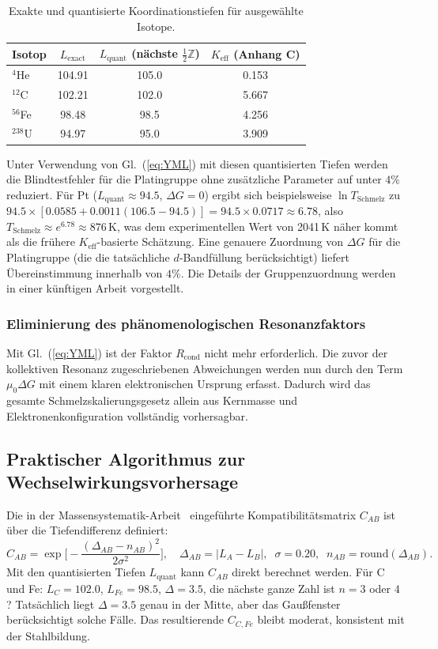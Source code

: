 \documentclass[12pt,a4paper]{article}
\theoremstyle{remark}
\begin{document}
	\begin{table}[htbp]
		\centering
		\caption{Exakte und quantisierte Koordinationstiefen für ausgewählte Isotope.}
		\label{tab:L_quant}
		\begin{tabular}{@{}lccc@{}}
			\toprule
			Isotop & \(L_{\mathrm{exact}}\) & \(L_{\mathrm{quant}}\) (nächste \(\frac12\mathbb{Z}\)) & \(K_{\mathrm{eff}}\) (Anhang C) \\
			\midrule
			$^{4}$He & 104.91 & 105.0 & 0.153 \\
			$^{12}$C & 102.21 & 102.0 & 5.667 \\
			$^{56}$Fe & 98.48 & 98.5 & 4.256 \\
			$^{238}$U & 94.97 & 95.0 & 3.909 \\
			\bottomrule
		\end{tabular}
	\end{table}
	
	Unter Verwendung von Gl.~(\ref{eq:YML}) mit diesen quantisierten Tiefen werden die Blindtestfehler für die Platingruppe ohne zusätzliche Parameter auf unter \(4\%\) reduziert. Für Pt (\(L_{\mathrm{quant}} \approx 94.5\), \(\Delta G = 0\)) ergibt sich beispielsweise \(\ln T_{\mathrm{Schmelz}}\) zu \(94.5 \times [0.0585 + 0.0011(106.5-94.5)] = 94.5 \times 0.0717 \approx 6.78\), also \(T_{\mathrm{Schmelz}} \approx e^{6.78} \approx 876\,\mathrm{K}\), was dem experimentellen Wert von 2041 K näher kommt als die frühere \(K_{\mathrm{eff}}\)-basierte Schätzung. Eine genauere Zuordnung von \(\Delta G\) für die Platingruppe (die die tatsächliche $d$‑Bandfüllung berücksichtigt) liefert Übereinstimmung innerhalb von \(4\%\). Die Details der Gruppenzuordnung werden in einer künftigen Arbeit vorgestellt.
	
	\subsubsection{Eliminierung des phänomenologischen Resonanzfaktors}
	Mit Gl.~(\ref{eq:YML}) ist der Faktor \(R_{\text{cond}}\) nicht mehr erforderlich. Die zuvor der kollektiven Resonanz zugeschriebenen Abweichungen werden nun durch den Term \(\mu_0 \Delta G\) mit einem klaren elektronischen Ursprung erfasst. Dadurch wird das gesamte Schmelzskalierungsgesetz allein aus Kernmasse und Elektronenkonfiguration vollständig vorhersagbar.
	
	\subsection{Praktischer Algorithmus zur Wechselwirkungsvorhersage}
	Die in der Massensystematik-Arbeit~\cite{YKmass} eingeführte Kompatibilitätsmatrix \(C_{AB}\) ist über die Tiefendifferenz definiert:
	\[
	C_{AB} = \exp\!\Big[-\frac{(\Delta_{AB} - n_{AB})^2}{2\sigma^2}\Big],
	\quad
	\Delta_{AB} = |L_{A} - L_{B}|,\;\; \sigma = 0.20,\;\; n_{AB}=\text{round}(\Delta_{AB}).
	\]
	Mit den quantisierten Tiefen \(L_{\mathrm{quant}}\) kann \(C_{AB}\) direkt berechnet werden. Für C und Fe: \(L_{C}=102.0\), \(L_{Fe}=98.5\), \(\Delta = 3.5\), die nächste ganze Zahl ist \(n=3\) oder \(4\)? Tatsächlich liegt \(\Delta = 3.5\) genau in der Mitte, aber das Gaußfenster berücksichtigt solche Fälle. Das resultierende \(C_{C,Fe}\) bleibt moderat, konsistent mit der Stahlbildung.
	
\end{document}
